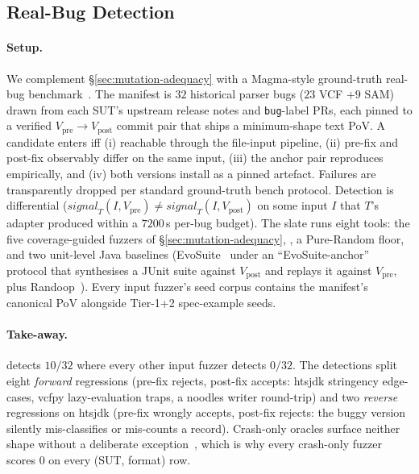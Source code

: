
\subsection{Real-Bug Detection}
\label{sec:bug-bench}



\paragraph{Setup.}
We complement \S\ref{sec:mutation-adequacy} with a Magma-style
ground-truth real-bug
benchmark~\citep{hazimeh2020magma,metzman2021fuzzbench}. The
manifest is $32$ historical parser bugs ($23$ VCF $+ 9$ SAM)
drawn from each SUT's upstream release notes and
\texttt{bug}-label PRs, each pinned to a verified
$V_{\mathrm{pre}}{\to}V_{\mathrm{post}}$ commit pair that ships
a minimum-shape text PoV. A candidate enters iff (i) reachable
through the file-input pipeline, (ii) pre-fix and post-fix
observably differ on the same input, (iii) the anchor pair
reproduces empirically, and (iv) both versions install as a
pinned artefact. Failures are transparently dropped per
standard ground-truth bench protocol. Detection is differential
($\mathit{signal}_T(I, V_{\mathrm{pre}}) \neq
\mathit{signal}_T(I, V_{\mathrm{post}})$ on some input $I$ that
$T$'s adapter produced within a $7200$\,s per-bug budget). The
slate runs eight tools: the five coverage-guided fuzzers of
\S\ref{sec:mutation-adequacy}, \biotest{}, a Pure-Random floor,
and two unit-level Java baselines
(EvoSuite~\citep{fraser2011evosuite} under an
``EvoSuite-anchor'' protocol that synthesises a JUnit suite
against $V_{\mathrm{post}}$ and replays it against
$V_{\mathrm{pre}}$, plus Randoop~\citep{pacheco2007randoop}).
Every input fuzzer's seed corpus contains the manifest's
canonical PoV alongside Tier-1+2 spec-example seeds.

\paragraph{Take-away.}
\biotest{} detects $10/32$ where every other input fuzzer
detects $0/32$. The detections split eight \emph{forward}
regressions (pre-fix rejects, post-fix accepts: htsjdk
stringency edge-cases, vcfpy lazy-evaluation traps, a noodles
writer round-trip) and two \emph{reverse} regressions on htsjdk
(pre-fix wrongly accepts, post-fix rejects: the buggy version
silently mis-classifies or mis-counts a record). Crash-only
oracles surface neither shape without a deliberate
exception~\citep{klees2018fuzz}, which is why every crash-only
fuzzer scores $0$ on every (SUT, format) row.


